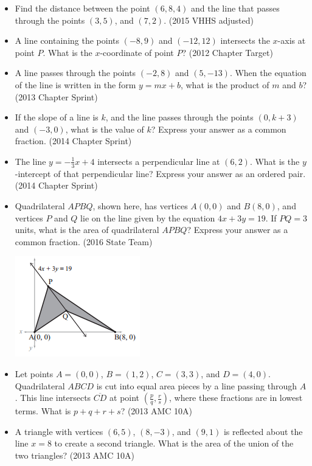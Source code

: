 \documentclass{article}
\begin{document}
\begin{itemize}
\item Find the distance between the point $(6,8,4)$ and the line that passes through the points $(3,5)$, and $(7,2)$. (2015 VHHS adjusted)

\item A line containing the points $(-8,9)$ and $(-12,12)$ intersects the $x$-axis at point $P$. What is the $x$-coordinate of point $P$? (2012 Chapter Target)

\item A line passes through the points $(-2,8)$ and $(5,-13)$. When the equation of the line is written in the form $y=mx+b$, what is the product of $m$ and $b$? (2013 Chapter Sprint)

\item If the slope of a line is $k$, and the line passes through the points $(0,k+3)$ and $(-3,0)$, what is the value of $k$? Express your answer as a common fraction. (2014 Chapter Sprint)

\item The line $y=-\frac{1}{3}x+4$ intersects a perpendicular line at $(6,2)$. What is the $y$-intercept of that perpendicular line? Express your answer as an ordered pair. (2014 Chapter Sprint)

\item Quadrilateral $APBQ$, shown here, has vertices $A(0,0)$ and $B(8,0)$, and vertices $P$ and $Q$ lie on the line given by the equation $4x+3y=19$. If $PQ=3$ units, what is the area of quadrilateral $APBQ$? Express your answer as a common fraction. (2016 State Team)

\centerline{\includegraphics{20168.png}}

\item Let points $A = (0, 0)$, $B = (1, 2)$, $C=(3, 3)$, and $D = (4, 0)$.  Quadrilateral $ABCD$ is cut into equal area pieces by a line passing through $A$.  This line intersects $\overline{CD}$ at point $(\frac{p}{q}, \frac{r}{s})$, where these fractions are in lowest terms.  What is $p+q+r+s$? (2013 AMC 10A)

\item A triangle with vertices $(6, 5)$, $(8, -3)$, and $(9, 1)$ is reflected about the line $x=8$ to create a second triangle.  What is the area of the union of the two triangles? (2013 AMC 10A)


\end{itemize}
\end{document}
